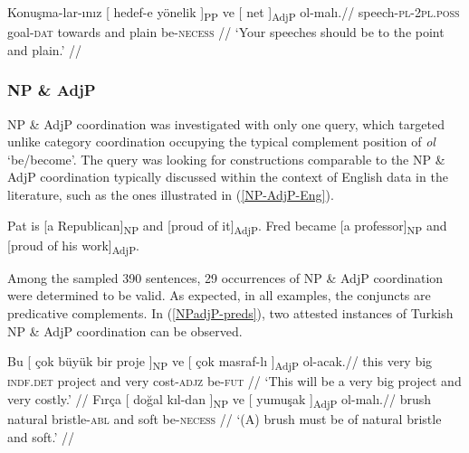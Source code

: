 \pex[glspace=!1em,everygla={},everyglb={},aboveglbskip=-.15ex, interpartskip=15pt]
\label{PPadjP-preds} \begingl
\gla Konuşma-lar-ınız {[} hedef-e {yönelik ]\textsubscript{PP}} ve {[} {net ]\textsubscript{AdjP}} ol-malı.//
\glb speech-\textsc{pl}-\textsc{2pl.poss} goal-\textsc{dat} towards and plain be-\textsc{necess} //
\glft `Your speeches should be to the point and plain.' //
\endgl
\xe

\subsubsection{NP \& AdjP}

NP \& AdjP coordination was investigated with only one query, which targeted unlike category coordination occupying the typical complement position of \textit{ol} `be/become'. The query was looking for constructions comparable to the NP \& AdjP coordination typically discussed within the context of English data in the literature, such as the ones illustrated in (\ref{NP-AdjP-Eng}).

 \label{NP-AdjP-Eng}
\a Pat is [a Republican]\textsubscript{NP} and [proud of it]\textsubscript{AdjP}. 
\a Fred became [a professor]\textsubscript{NP} and [proud of his work]\textsubscript{AdjP}. 
\xe

Among the sampled 390 sentences, 29 occurrences of NP \& AdjP coordination were determined to be valid. As expected, in all examples, the conjuncts are predicative complements. In (\ref{NPadjP-preds}), two attested instances of Turkish NP \& AdjP coordination can be observed.  

\pex[glspace=!1em,everygla={},everyglb={},aboveglbskip=-.15ex, interpartskip=15pt]
\label{NPadjP-preds} 
\a
\begingl
\gla Bu {[} çok büyük bir {proje ]\textsubscript{NP}} ve {[} çok {masraf-lı ]\textsubscript{AdjP}} ol-acak.//
\glb this very big \textsc{indf.det} project and very cost-\textsc{adjz} be-\textsc{fut} //
\glft `This will be a very big project and very costly.' //
\endgl
\a
\begingl
\gla Fırça {[} doğal {kıl-dan ]\textsubscript{NP}} ve {[} {yumuşak ]\textsubscript{AdjP}} ol-malı.//
\glb brush natural bristle-\textsc{abl} and soft be-\textsc{necess} //
\glft `(A) brush must be of natural bristle and soft.' //
\endgl
\xe

